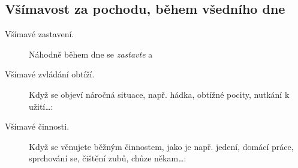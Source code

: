 	\subsection{Všímavost za pochodu, během všedního dne}
		\begin{description}
			\item[ Všímavé zastavení.] Náhodně během dne se \emph{zastavte} a 
			\item[ Všímavé zvládání obtíží.]
				Když se objeví náročná situace, např. hádka, obtížné pocity, nutkání k užití…:
			\item[ Všímavé činnosti.]
				Když se věnujete běžným činnostem, jako je např. jedení, domácí práce, sprchování se, čištění zubů, chůze někam…:
		\end{description}
		\vfill


